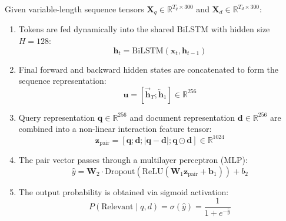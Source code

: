 \documentclass[12pt,a4paper]{report}
\begin{document}
Given variable-length sequence tensors $\mathbf{X}_q \in \mathbb{R}^{T_q \times 300}$ and $\mathbf{X}_d \in \mathbb{R}^{T_d \times 300}$:
\begin{enumerate}
    \item Tokens are fed dynamically into the shared BiLSTM with hidden size $H=128$:
    \begin{equation}
        \mathbf{h}_t = \text{BiLSTM}(\mathbf{x}_t, \mathbf{h}_{t-1})
    \end{equation}
    \item Final forward and backward hidden states are concatenated to form the sequence representation:
    \begin{equation}
        \mathbf{u} = [\overrightarrow{\mathbf{h}}_{T}; \overleftarrow{\mathbf{h}}_{1}] \in \mathbb{R}^{256}
    \end{equation}
    \item Query representation $\mathbf{q} \in \mathbb{R}^{256}$ and document representation $\mathbf{d} \in \mathbb{R}^{256}$ are combined into a non-linear interaction feature tensor:
    \begin{equation}
        \mathbf{z}_{\text{pair}} = [\mathbf{q}; \mathbf{d}; |\mathbf{q} - \mathbf{d}|; \mathbf{q} \odot \mathbf{d}] \in \mathbb{R}^{1024}
    \end{equation}
    \item The pair vector passes through a multilayer perceptron (MLP):
    \begin{equation}
        \hat{y} = \mathbf{W}_2 \cdot \text{Dropout}(\text{ReLU}(\mathbf{W}_1 \mathbf{z}_{\text{pair}} + \mathbf{b}_1)) + b_2
    \end{equation}
    \item The output probability is obtained via sigmoid activation:
    \begin{equation}
        P(\text{Relevant} \mid q, d) = \sigma(\hat{y}) = \frac{1}{1 + e^{-\hat{y}}}
    \end{equation}
\end{enumerate}
\end{document}
